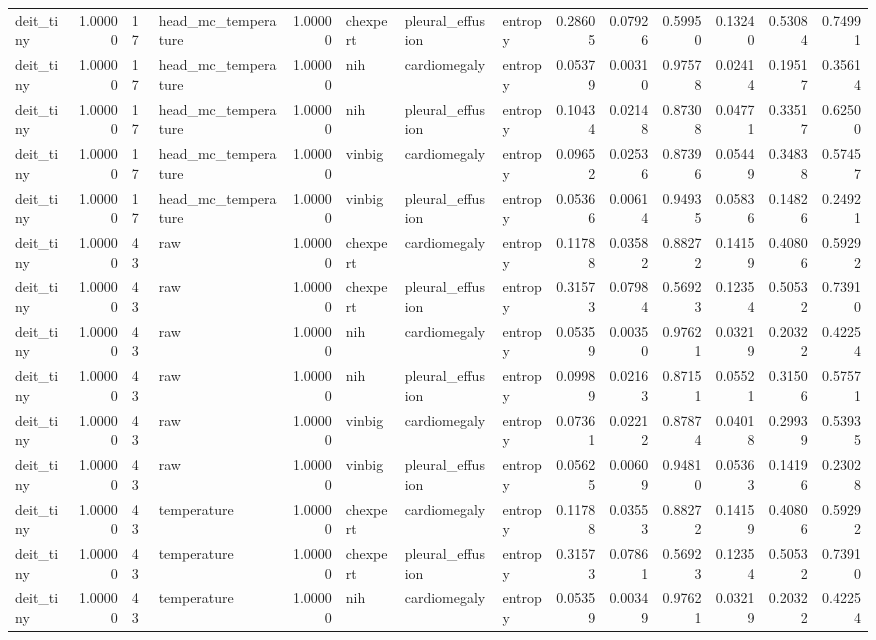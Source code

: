 \begin{tabular}{lrllrlllrrrrrr}
deit\_tiny & 1.00000 & 17 & head\_mc\_temperature & 1.00000 & chexpert & pleural\_effusion & entropy & 0.28605 & 0.07926 & 0.59950 & 0.13240 & 0.53084 & 0.74991 \\
deit\_tiny & 1.00000 & 17 & head\_mc\_temperature & 1.00000 & nih & cardiomegaly & entropy & 0.05379 & 0.00310 & 0.97578 & 0.02414 & 0.19517 & 0.35614 \\
deit\_tiny & 1.00000 & 17 & head\_mc\_temperature & 1.00000 & nih & pleural\_effusion & entropy & 0.10434 & 0.02148 & 0.87308 & 0.04771 & 0.33517 & 0.62500 \\
deit\_tiny & 1.00000 & 17 & head\_mc\_temperature & 1.00000 & vinbig & cardiomegaly & entropy & 0.09652 & 0.02536 & 0.87396 & 0.05449 & 0.34838 & 0.57457 \\
deit\_tiny & 1.00000 & 17 & head\_mc\_temperature & 1.00000 & vinbig & pleural\_effusion & entropy & 0.05366 & 0.00614 & 0.94935 & 0.05836 & 0.14826 & 0.24921 \\
deit\_tiny & 1.00000 & 43 & raw & 1.00000 & chexpert & cardiomegaly & entropy & 0.11788 & 0.03582 & 0.88272 & 0.14159 & 0.40806 & 0.59292 \\
deit\_tiny & 1.00000 & 43 & raw & 1.00000 & chexpert & pleural\_effusion & entropy & 0.31573 & 0.07984 & 0.56923 & 0.12354 & 0.50532 & 0.73910 \\
deit\_tiny & 1.00000 & 43 & raw & 1.00000 & nih & cardiomegaly & entropy & 0.05359 & 0.00350 & 0.97621 & 0.03219 & 0.20322 & 0.42254 \\
deit\_tiny & 1.00000 & 43 & raw & 1.00000 & nih & pleural\_effusion & entropy & 0.09989 & 0.02163 & 0.87151 & 0.05521 & 0.31506 & 0.57571 \\
deit\_tiny & 1.00000 & 43 & raw & 1.00000 & vinbig & cardiomegaly & entropy & 0.07361 & 0.02212 & 0.87874 & 0.04018 & 0.29939 & 0.53935 \\
deit\_tiny & 1.00000 & 43 & raw & 1.00000 & vinbig & pleural\_effusion & entropy & 0.05625 & 0.00609 & 0.94810 & 0.05363 & 0.14196 & 0.23028 \\
deit\_tiny & 1.00000 & 43 & temperature & 1.00000 & chexpert & cardiomegaly & entropy & 0.11788 & 0.03553 & 0.88272 & 0.14159 & 0.40806 & 0.59292 \\
deit\_tiny & 1.00000 & 43 & temperature & 1.00000 & chexpert & pleural\_effusion & entropy & 0.31573 & 0.07861 & 0.56923 & 0.12354 & 0.50532 & 0.73910 \\
deit\_tiny & 1.00000 & 43 & temperature & 1.00000 & nih & cardiomegaly & entropy & 0.05359 & 0.00349 & 0.97621 & 0.03219 & 0.20322 & 0.42254 \\

\end{tabular}
